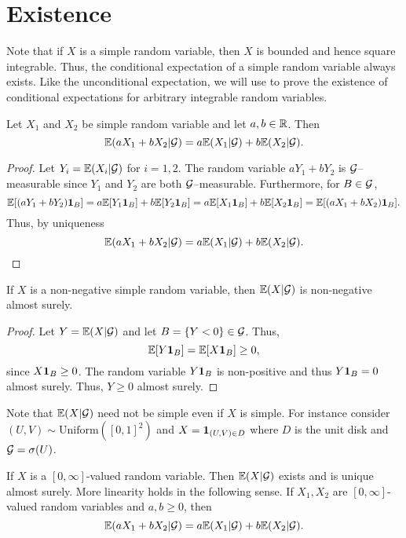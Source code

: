 \section{Existence}
Note that if $X$ is a simple random variable, then $X$ is bounded and hence square integrable. Thus, the conditional expectation of a simple random variable always exists. Like the unconditional expectation, we will use to prove the existence of conditional expectations for arbitrary integrable random variables. 
\begin{lemma}
    Let $X_1$ and $X_2$ be simple random variable and let $a,b \in {\mathbb R}$. Then 
    \[{\mathbb{E}}(aX_1+bX_2|{\mathcal{G}}) = a{\mathbb{E}}(X_1|{\mathcal{G}})+b{\mathbb{E}}(X_2|{\mathcal{G}}).\]
\end{lemma}
\begin{proof}
    Let $Y_i = {\mathbb{E}}(X_i | {\mathcal{G}})$ for $i=1,2$. The random variable $aY_1+bY_2$ is ${\mathcal{G}}$--measurable since $Y_1$ and $Y_2$ are both ${\mathcal{G}}$--measurable. Furthermore, for $B \in {\mathcal{G}}$,
    \[{\mathbb{E}}[(aY_1+bY_2){{\bf 1}}_B]=a{\mathbb{E}}[Y_1{{\bf 1}}_B]+b{\mathbb{E}}[Y_2{{\bf 1}}_B]=a{\mathbb{E}}[X_1{{\bf 1}}_B]+b{\mathbb{E}}[X_2{{\bf 1}}_B]={\mathbb{E}}[(aX_1+bX_2){{\bf 1}}_B].\]
    Thus, by uniqueness
    \[{\mathbb{E}}(aX_1+bX_2|{\mathcal{G}}) = a{\mathbb{E}}(X_1|{\mathcal{G}})+b{\mathbb{E}}(X_2|{\mathcal{G}}).\qedhere\]
\end{proof}
\begin{lemma}
If $X$ is a non-negative simple random variable, then ${\mathbb{E}}(X|{\mathcal{G}})$ is non-negative almost surely.
\end{lemma}
\begin{proof}
    Let $Y = {\mathbb{E}}(X|{\mathcal{G}})$ and let $B = \{Y<0\} \in {\mathcal{G}}$. Thus,
    \[{\mathbb{E}}[Y{{\bf 1}}_B]={\mathbb{E}}[X{{\bf 1}}_B] \ge 0, \]
    since $X{{\bf 1}}_B \ge 0$. The random variable $Y{{\bf 1}}_B$ is non-positive and thus $Y{{\bf 1}}_B = 0$ almost surely. Thus, $Y \ge 0$ almost surely.
\end{proof}
Note that ${\mathbb{E}}(X|{\mathcal{G}})$ need not be simple even if $X$ is simple. For instance consider $(U,V) \sim \text{Uniform}([0,1]^2)$ and $X = {{\bf 1}}_{(U,V) \in D}$ where $D$ is the unit disk and ${\mathcal{G}} = \sigma(U)$.
\begin{lemma}
    If $X$ is a $[0,\infty]$-valued random variable. Then ${\mathbb{E}}(X|{\mathcal{G}})$ exists and is unique almost surely. More linearity holds in the following sense. If $X_1, X_2$ are $[0,\infty]$-valued random variables and $a,b \ge 0$, then 
    \[{\mathbb{E}}(aX_1+bX_2|{\mathcal{G}}) = a{\mathbb{E}}(X_1|{\mathcal{G}})+b{\mathbb{E}}(X_2|{\mathcal{G}}). \]
\end{lemma}
